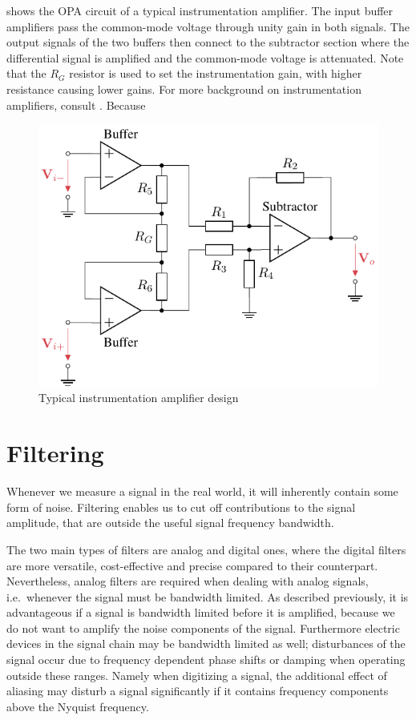  shows the \ac{OPA} circuit of a typical instrumentation amplifier. The input buffer amplifiers pass the common-mode voltage through unity gain in both signals. The output signals of the two buffers then connect to the subtractor section where the differential signal is amplified and the common-mode voltage is attenuated. Note that the $R_G$ resistor is used to set the instrumentation gain, with higher resistance causing lower gains. For more background on instrumentation amplifiers, consult \cite{kitchin2006inst}.
Because
\begin{figure}[!htb]
  \centering
  \includegraphics[scale=0.9]{figures/electronics/op_amp/in_amp_circuit/in_amp_circuit}
  \caption[Typical Instrumentation Amplifier Design]{Typical instrumentation amplifier design%
  \label{fig:in_amp_circuit}}
\end{figure}

\section{Filtering}
Whenever we measure a signal in the real world, it will inherently contain some form of noise. Filtering enables us to cut off contributions to the signal amplitude, that are outside the useful signal frequency bandwidth.

The two main types of filters are analog and digital ones, where the digital filters are more versatile, cost-effective and precise compared to their counterpart. Nevertheless, analog filters are required when dealing with analog signals, i.e.\ whenever the signal must be bandwidth limited. As described previously, it is advantageous if a signal is bandwidth limited before it is amplified, because we do not want to amplify the noise components of the signal. Furthermore electric devices in the signal chain may be bandwidth limited as well; disturbances of the signal occur due to frequency dependent phase shifts or damping when operating outside these ranges. Namely when digitizing a signal, the additional effect of aliasing may disturb a signal significantly if it contains frequency components above the Nyquist frequency.

